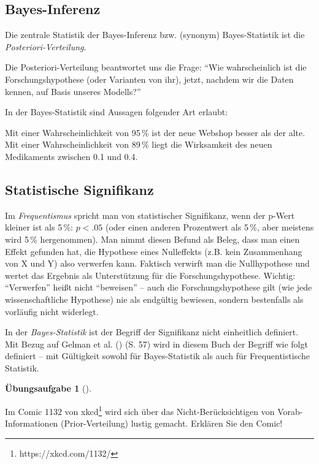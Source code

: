 \documentclass[
  ngerman,
  letterpaper,
  twoside,
  open=any]{scrbook}
\theoremstyle{definition}
\theoremstyle{plain}
\theoremstyle{definition}
\newtheorem{exercise}{Übungsaufgabe}[chapter]
\theoremstyle{definition}
\theoremstyle{definition}
\theoremstyle{definition}
\newtheorem{exercise}{Übungsaufgabe}[chapter]
\theoremstyle{remark}
\begin{document}
\subsection{Bayes-Inferenz}\label{bayes-inferenz}

Die zentrale Statistik der Bayes-Inferenz bzw. (synonym) Bayes-Statistik
ist die \emph{Posteriori-Verteilung}.

Die Posteriori-Verteilung beantwortet uns die Frage: \enquote{Wie
wahrscheinlich ist die Forschungshypothese (oder Varianten von ihr),
jetzt, nachdem wir die Daten kennen, auf Basis unseres Modells?}

In der Bayes-Statistik sind Aussagen folgender Art erlaubt:

\begin{displayquote}
Mit einer Wahrscheinlichkeit von 95\,\% ist der neue Webshop besser als
der alte. Mit einer Wahrscheinlichkeit von 89\,\% liegt die Wirksamkeit
des neuen Medikaments zwischen 0.1 und 0.4.
\end{displayquote}

\subsection{Statistische Signifikanz}\label{statistische-signifikanz}

Im \emph{Frequentismus} spricht man von statistischer Signifikanz, wenn
der p-Wert kleiner ist als 5\,\%: \(p<.05\) (oder einen anderen
Prozentwert als 5\,\%, aber meistens wird 5\,\% hergenommen). Man nimmt
diesen Befund als Beleg, dass man einen Effekt gefunden hat, die
Hypothese eines Nulleffekts (z.B. kein Zusammenhang von X und Y) also
verwerfen kann. Faktisch verwirft man die Nullhypothese und wertet das
Ergebnis als Unterstützung für die Forschungshypothese. Wichtig:
\enquote{Verwerfen} heißt nicht \enquote{beweisen} -- auch die
Forschungshypothese gilt (wie jede wissenschaftliche Hypothese) nie als
endgültig bewiesen, sondern bestenfalls als vorläufig nicht widerlegt.

In der \emph{Bayes-Statistik} ist der Begriff der Signifikanz nicht
einheitlich definiert. Mit Bezug auf Gelman et al.
() (S. 57) wird in diesem Buch der
Begriff wie folgt definiert -- mit Gültigkeit sowohl für Bayes-Statistik
als auch für Frequentistische Statistik.

\begin{exercise}[]\protect\hypertarget{exr-sun-explodes}{}\label{exr-sun-explodes}

Im Comic 1132 von xkcd\footnote{https://xkcd.com/1132/} wird sich über
das Nicht-Berücksichtigen von Vorab-Informationen (Prior-Verteilung)
lustig gemacht. Erklären Sie den Comic!

\end{exercise}
\end{document}
